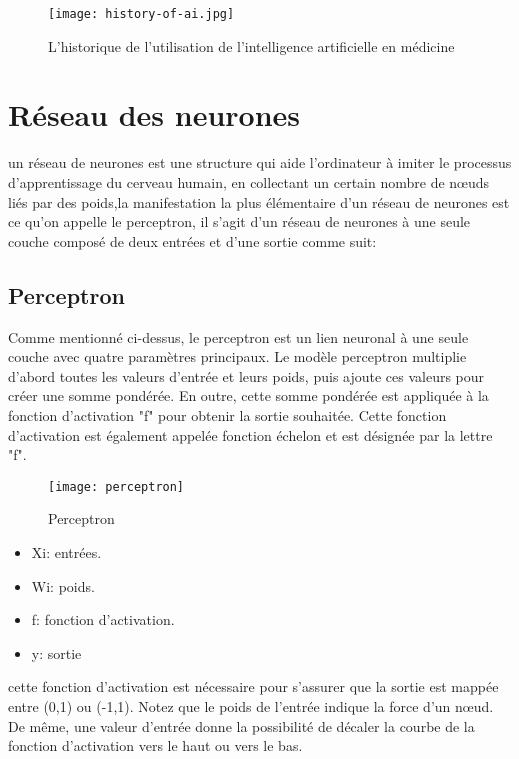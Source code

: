     \begin{figure}[H]
        \centering
        \texttt{[image: history-of-ai.jpg]}
        \caption{L'historique de l'utilisation de l'intelligence artificielle en médicine}
        \label{fig:history-of-ai}
    \end{figure}

\section{Réseau des neurones}
        un réseau de neurones est une structure qui aide l'ordinateur à imiter le processus d'apprentissage du cerveau humain, en collectant un certain nombre de nœuds liés par des poids,la manifestation la plus élémentaire d'un réseau de neurones est ce qu'on appelle le perceptron, il s'agit d'un réseau de neurones à une seule couche composé de deux entrées et d'une sortie comme suit:

        \subsection{Perceptron}
            Comme mentionné ci-dessus, le perceptron est  un lien neuronal à une seule couche avec quatre paramètres principaux. Le modèle perceptron multiplie d'abord toutes les valeurs d'entrée et leurs poids, puis ajoute ces valeurs pour créer une somme pondérée. En outre, cette somme pondérée est appliquée à la fonction d'activation "f" pour obtenir la sortie souhaitée. Cette fonction d'activation est également appelée fonction échelon et est désignée par la lettre "f".
            \begin{figure}[H]
                \centering
                \texttt{[image: perceptron]}
                \caption{Perceptron}
                \label{fig:perceptron}
            \end{figure}

            \begin{itemize}[label=$\bullet$]
                \item Xi: entrées.
                \item Wi: poids.
                \item f: fonction d'activation.
                \item y: sortie 
            \end{itemize}

            cette fonction d'activation est nécessaire pour s'assurer que la sortie est  mappée entre (0,1) ou (-1,1). Notez que le poids de l'entrée indique la force d'un nœud. De même, une valeur d'entrée donne la possibilité de décaler la courbe de la fonction d'activation vers le haut ou vers le bas.
            
